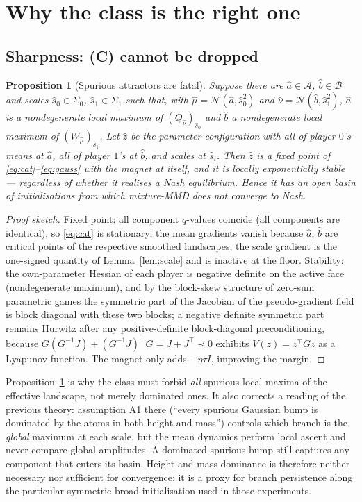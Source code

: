 \documentclass[11pt]{article}
\newtheorem{proposition}{Proposition}
\theoremstyle{definition}
\newcommand{\cA}{\mathcal{A}}
\newcommand{\cB}{\mathcal{B}}
\newcommand{\cN}{\mathcal{N}}
\begin{document}
\section{Why the class is the right one}

\subsection{Sharpness: (C) cannot be dropped}

\begin{proposition}[Spurious attractors are fatal]\label{prop:sharp}
Suppose there are $\hat a \in \cA$, $\hat b \in \cB$ and scales
$\hat s_0 \in \Sigma_0$, $\hat s_1 \in \Sigma_1$ such that, with
$\hat\mu = \cN(\hat a, \hat s_0^2)$ and $\hat\nu = \cN(\hat b, \hat s_1^2)$,
$\hat a$ is a nondegenerate local maximum of $(Q_{\hat\nu})_{\hat s_0}$ and
$\hat b$ a nondegenerate local maximum of $(W_{\hat\mu})_{\hat s_1}$. Let
$\hat z$ be the parameter configuration with all of player $0$'s means at
$\hat a$, all of player $1$'s at $\hat b$, and scales at $\hat s_i$. Then
$\hat z$ is a fixed point of \eqref{eq:cat}--\eqref{eq:gauss} with the magnet at
itself, and it is locally exponentially stable --- \emph{regardless of whether it
realises a Nash equilibrium}. Hence it has an open basin of initialisations from
which mixture-MMD does not converge to Nash.
\end{proposition}

\begin{proof}[Proof sketch]
Fixed point: all component $q$-values coincide (all components are identical), so
\eqref{eq:cat} is stationary; the mean gradients vanish because $\hat a$, $\hat b$
are critical points of the respective smoothed landscapes; the scale gradient is
the one-signed quantity of Lemma~\ref{lem:scale} and is inactive at the floor.
Stability: the own-parameter Hessian of each player is negative definite on the
active face (nondegenerate maximum), and by the block-skew structure of zero-sum
parametric games the symmetric part of the Jacobian of the pseudo-gradient field
is block diagonal with these two blocks; a negative definite symmetric part
remains Hurwitz after any positive-definite block-diagonal preconditioning,
because $G(G^{-1}J) + (G^{-1}J)^\top G = J + J^\top \prec 0$ exhibits
$V(z) = z^\top G z$ as a Lyapunov function. The magnet only adds
$-\eta\tau I$, improving the margin.
\end{proof}

Proposition~\ref{prop:sharp} is why the class must forbid \emph{all} spurious
local maxima of the effective landscape, not merely dominated ones. It also
corrects a reading of the previous theory: assumption A1 there (``every spurious
Gaussian bump is dominated by the atoms in both height and mass'') controls
which branch is the \emph{global} maximum at each scale, but the mean dynamics
perform local ascent and never compare global amplitudes. A dominated spurious
bump still captures any component that enters its basin. Height-and-mass
dominance is therefore neither necessary nor sufficient for convergence; it is a
proxy for branch persistence along the particular symmetric broad initialisation
used in those experiments.
\end{document}
